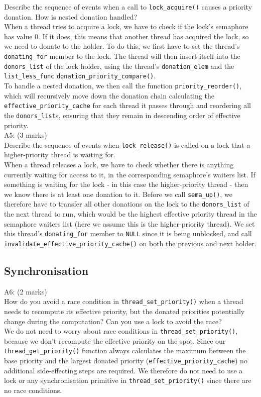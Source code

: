 \documentclass[11pt, a4paper]{article}
\begin{document}
		Describe the sequence of events when a call to \verb+lock_acquire()+ causes a priority 
		donation. How is nested donation handled?\bigskip\\
		When a thread tries to acquire a lock, we have to check if the lock's semaphore has value 0. If it does, this means that another thread has acquired the lock,
    so we need to donate to the holder. To do this, we first have to set the thread's \verb+donating_for+ member to the lock. The thread
    will then insert itself into the \verb+donors_list+ of the lock holder, using the thread's \verb+donation_elem+ and the \verb+list_less_func+ \verb+donation_priority_compare()+.\\
    To handle a nested donation, we then call the function \verb+priority_reorder()+, which will recursively move down the donation chain calculating the 
    \verb+effective_priority_cache+ for each thread
    it passes through and reordering all the 
    \verb+donors_list+s, ensuring that they remain
    in descending order of effective priority.\bigskip\\
		A5: (3 marks)\\
		Describe the sequence of events when \verb+lock_release()+ is called on a lock that a 
		higher-priority thread is waiting for.\bigskip\\
    When a thread releases a lock, we have to check whether there is anything currently waiting for access to it, in the corresponding semaphore's waiters list. If 
    something is waiting for the lock - in this case the 
    higher-priority thread - then we know there is at least
    one donation to it. Before we call \verb+sema_up()+, 
    we therefore have to transfer all other donations 
    on the lock to the \verb+donors_list+ of the next
    thread to run, which would be the highest effective 
    priority thread in the semaphore waiters list (here we
    assume this is the higher-priority thread). We set 
    this thread's \verb+donating_for+ member to 
    \verb+NULL+ since it is being unblocked, and call
    \verb+invalidate_effective_priority_cache()+ on both
    the previous and next holder.
  
	\subsection{Synchronisation}
		A6: (2 marks)\\
		How do you avoid a race condition in \verb+thread_set_priority()+ when a thread needs to 
		recompute its effective priority, but the donated priorities potentially change during the 
		computation? Can you use a lock to avoid the race?\bigskip\\
		We do not need to worry about race conditions
		in \verb+thread_set_priority()+, because
		we don't recompute the effective priority
    on the spot. Since our \verb+thread_get_priority()+
		function always calculates the maximum between
		the base priority and the largest donated priority
		(\verb+effective_priority_cache+) no additional
		side-effecting steps are required. We therefore do not need
    to use a lock or any synchronisation primitive in 
    \verb+thread_set_priority()+ since there are no race conditions.
\end{document}
